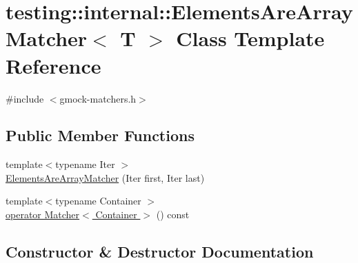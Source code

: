 \hypertarget{classtesting_1_1internal_1_1_elements_are_array_matcher}{}\section{testing\+:\+:internal\+:\+:Elements\+Are\+Array\+Matcher$<$ T $>$ Class Template Reference}
\label{classtesting_1_1internal_1_1_elements_are_array_matcher}


{\ttfamily \#include $<$gmock-\/matchers.\+h$>$}

\subsection*{Public Member Functions}
\begin{DoxyCompactItemize}
\item 
{\footnotesize template$<$typename Iter $>$ }\\\hyperlink{classtesting_1_1internal_1_1_elements_are_array_matcher_aa076a0583c29dc7da6107775bba73be8}{Elements\+Are\+Array\+Matcher} (Iter first, Iter last)
\item 
{\footnotesize template$<$typename Container $>$ }\\\hyperlink{classtesting_1_1internal_1_1_elements_are_array_matcher_ac776db6072208f39f3eced25fb353f75}{operator Matcher$<$ Container $>$} () const
\end{DoxyCompactItemize}


\subsection{Constructor \& Destructor Documentation}
\mbox{\label{classtesting_1_1internal_1_1_elements_are_array_matcher_aa076a0583c29dc7da6107775bba73be8}} 
